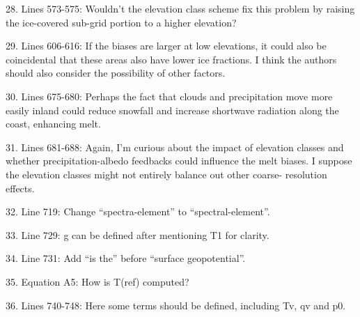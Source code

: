 \documentclass[12pt,oneside,a4paper]{article}%
\begin{document}
28. Lines 573-575: Wouldn’t the elevation class scheme fix this problem by raising the ice-covered sub-grid portion to a higher elevation? \newline

29. Lines 606-616: If the biases are larger at low elevations, it could also be coincidental that these areas also have lower ice fractions. I think the authors should also consider the possibility of other factors. \newline

30. Lines 675-680: Perhaps the fact that clouds and precipitation move more easily inland could reduce snowfall and increase shortwave radiation along the coast, enhancing melt. \newline

31. Lines 681-688: Again, I’m curious about the impact of elevation classes and whether precipitation-albedo feedbacks could influence the melt biases. I suppose the elevation classes might not entirely balance out other coarse- resolution effects. \newline

32. Line 719: Change “spectra-element” to “spectral-element”. \newline

33. Line 729: g can be defined after mentioning T1 for clarity. \newline

34. Line 731: Add “is the” before “surface geopotential”. \newline

35. Equation A5: How is T(ref) computed? \newline

36. Lines 740-748: Here some terms should be defined, including Tv, qv and p0.

\end{document}
